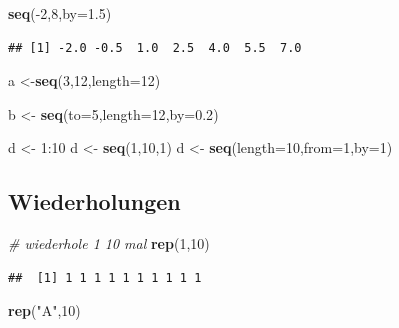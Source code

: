 \documentclass[]{article}
\newenvironment{Shaded}{\begin{snugshade}}{\end{snugshade}}
\newcommand{\KeywordTok}[1]{\textcolor[rgb]{0.13,0.29,0.53}{\textbf{{#1}}}}
\newcommand{\DataTypeTok}[1]{\textcolor[rgb]{0.13,0.29,0.53}{{#1}}}
\newcommand{\DecValTok}[1]{\textcolor[rgb]{0.00,0.00,0.81}{{#1}}}
\newcommand{\FloatTok}[1]{\textcolor[rgb]{0.00,0.00,0.81}{{#1}}}
\newcommand{\StringTok}[1]{\textcolor[rgb]{0.31,0.60,0.02}{{#1}}}
\newcommand{\CommentTok}[1]{\textcolor[rgb]{0.56,0.35,0.01}{\textit{{#1}}}}
\newcommand{\NormalTok}[1]{{#1}}
\begin{document}
\begin{Shaded}
\begin{Highlighting}[]
\KeywordTok{seq}\NormalTok{(-}\DecValTok{2}\NormalTok{,}\DecValTok{8}\NormalTok{,}\DataTypeTok{by=}\FloatTok{1.5}\NormalTok{)}
\end{Highlighting}
\end{Shaded}

\begin{verbatim}
## [1] -2.0 -0.5  1.0  2.5  4.0  5.5  7.0
\end{verbatim}

\begin{Shaded}
\begin{Highlighting}[]
\NormalTok{a <-}\KeywordTok{seq}\NormalTok{(}\DecValTok{3}\NormalTok{,}\DecValTok{12}\NormalTok{,}\DataTypeTok{length=}\DecValTok{12}\NormalTok{)}

\NormalTok{b <-}\StringTok{ }\KeywordTok{seq}\NormalTok{(}\DataTypeTok{to=}\DecValTok{5}\NormalTok{,}\DataTypeTok{length=}\DecValTok{12}\NormalTok{,}\DataTypeTok{by=}\FloatTok{0.2}\NormalTok{)}

\NormalTok{d <-}\StringTok{ }\DecValTok{1}\NormalTok{:}\DecValTok{10}
\NormalTok{d <-}\StringTok{ }\KeywordTok{seq}\NormalTok{(}\DecValTok{1}\NormalTok{,}\DecValTok{10}\NormalTok{,}\DecValTok{1}\NormalTok{)}
\NormalTok{d <-}\StringTok{ }\KeywordTok{seq}\NormalTok{(}\DataTypeTok{length=}\DecValTok{10}\NormalTok{,}\DataTypeTok{from=}\DecValTok{1}\NormalTok{,}\DataTypeTok{by=}\DecValTok{1}\NormalTok{)}
\end{Highlighting}
\end{Shaded}

\subsection{Wiederholungen}\label{wiederholungen}

\begin{Shaded}
\begin{Highlighting}[]
\CommentTok{# wiederhole 1 10 mal}
\KeywordTok{rep}\NormalTok{(}\DecValTok{1}\NormalTok{,}\DecValTok{10}\NormalTok{)}
\end{Highlighting}
\end{Shaded}

\begin{verbatim}
##  [1] 1 1 1 1 1 1 1 1 1 1
\end{verbatim}

\begin{Shaded}
\begin{Highlighting}[]
\KeywordTok{rep}\NormalTok{(}\StringTok{"A"}\NormalTok{,}\DecValTok{10}\NormalTok{)}
\end{Highlighting}
\end{Shaded}
\end{document}

